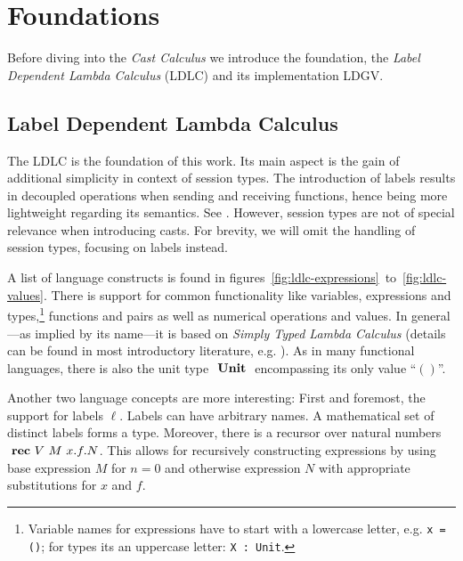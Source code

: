 \chapter{Foundations}\label{chap:foundations}

Before diving into the \emph{Cast Calculus} we introduce the foundation, the \emph{Label Dependent Lambda Calculus} (LDLC) and its implementation LDGV.

\section{Label Dependent Lambda Calculus}\label{sec:ldlc}

The LDLC is the foundation of this work. Its main aspect is the gain of additional simplicity in context of session types. The introduction of labels results in decoupled operations when sending and receiving functions, hence being more lightweight regarding its semantics. See \cite{thiemann2019}. However, session types are not of special relevance when introducing casts. For brevity, we will omit the handling of session types, focusing on labels instead.

A list of language constructs is found in figures~\ref{fig:ldlc-expressions}~to~\ref{fig:ldlc-values}. There is support for common functionality like variables, expressions and types,\footnote{
Variable names for expressions have to start with a lowercase letter, e.g. \texttt{\valb x = ()}; for types its an uppercase letter: \texttt{\typeb X : Unit}.} functions and pairs as well as numerical operations and values. In general---as implied by its name---it is based on \emph{Simply Typed Lambda Calculus} (details can be found in most introductory literature, e.g. \cite{pierce2002}). As in many functional languages, there is also the unit type $\text{ \textbf{Unit} }$ encompassing its only value ``$()$''.

Another two language concepts are more interesting: First and foremost, the support for labels $\ell$. Labels can have arbitrary names. A mathematical set of distinct labels forms a type. Moreover, there is a recursor over natural numbers $\text{ \textbf{rec} } V~M~x.f.N$. This allows for recursively constructing expressions by using base expression $M$ for $n=0$ and otherwise expression $N$ with appropriate substitutions for $x$ and $f$.

